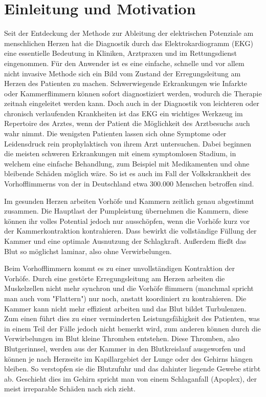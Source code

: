 
\section{Einleitung und Motivation}

Seit der Entdeckung der Methode zur Ableitung der elektrischen Potenziale am menschlichen Herzen hat die Diagnostik durch das Elektrokardiogramm (EKG) eine essentielle Bedeutung in Kliniken, Arztpraxen und im Rettungsdienst eingenommen. Für den Anwender ist es eine einfache, schnelle und vor allem nicht invasive Methode sich ein Bild vom Zustand der Erregungsleitung am Herzen des Patienten zu machen. Schwerwiegende Erkrankungen wie Infarkte oder Kammerflimmern können sofort diagnostiziert werden, wodurch die Therapie zeitnah eingeleitet werden kann. Doch auch in der Diagnostik von leichteren oder chronisch verlaufenden Krankheiten ist das EKG ein wichtiges Werkzeug im Repertoire des Arztes, wenn der Patient die Möglichkeit des Arztbesuchs auch wahr nimmt. Die wenigsten Patienten lassen sich ohne Symptome oder Leidensdruck rein prophylaktisch von ihrem Arzt untersuchen. Dabei beginnen die meisten schweren Erkrankungen mit einem symptomlosen Stadium, in welchem eine einfache Behandlung, zum Beispiel mit Medikamenten und ohne bleibende Schäden möglich wäre. So ist es auch im Fall der Volkskrankheit des Vorhofflimmerns von der in Deutschland etwa 300.000 Menschen betroffen sind. 

Im gesunden Herzen arbeiten Vorhöfe und Kammern zeitlich genau abgestimmt zusammen. Die Hauptlast der Pumpleistung übernehmen die Kammern, diese können ihr volles Potential jedoch nur ausschöpfen, wenn die Vorhöfe kurz vor der Kammerkontraktion kontrahieren. Dass bewirkt die vollständige Füllung der Kammer und eine optimale Ausnutzung der Schlagkraft. Außerdem fließt das Blut so möglichst laminar, also ohne Verwirbelungen. 

Beim Vorhofflimmern kommt es zu einer unvollständigen Kontraktion der Vorhöfe. Durch eine gestörte Erregungsleitung am Herzen arbeiten die Muskelzellen nicht mehr synchron und die Vorhöfe flimmern (manchmal spricht man auch vom "Flattern") nur noch, anstatt koordiniert zu kontrahieren. Die Kammer kann nicht mehr effizient arbeiten und das Blut bildet Turbulenzen. Zum einen führt dies zu einer verminderten Leistungsfähigkeit des Patienten, was in einem Teil der Fälle jedoch nicht bemerkt wird, zum anderen können durch die Verwirbelungen im Blut kleine Thromben entstehen. Diese Thromben, also Blutgerinnsel, werden aus der Kammer in den Blutkreislauf ausgeworfen und können je nach Herzseite im Kapillargebiet der Lunge oder des Gehirns hängen bleiben. So verstopfen sie die Blutzufuhr und das dahinter liegende Gewebe stirbt ab. Geschieht dies im Gehirn spricht man von einem Schlaganfall (Apoplex), der meist irreparable Schäden nach sich zieht. 

